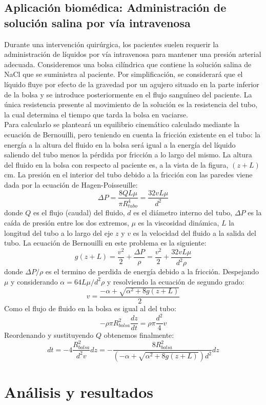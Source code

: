 \documentclass[10pt]{article}
\begin{document}
\begin{multicols}{2}
		\subsection{Aplicación biomédica: Administración de solución salina por vía intravenosa}
		Durante una intervención quirúrgica, los pacientes suelen
		requerir la administración de líquidos por vía intravenosa para
		mantener una presión arterial adecuada. Consideremos una
		bolsa cilíndrica que contiene la solución salina de
		NaCl que se suministra al paciente. Por simplificación, se
		considerará que el líquido fluye por efecto de la gravedad por
		un agujero situado en la parte inferior de la bolsa y se introduce
		posteriormente en el flujo sanguíneo del paciente. La única
		resistencia presente al movimiento de la solución es la
		resistencia del tubo, la cual determina el tiempo que tarda la
		bolsa en vaciarse. \\
		Para calcularlo se planteará un equilibrio cinemático calculado
		mediante la ecuación de Bernouilli, pero teniendo en cuenta la fricción existente en
		el tubo: la energía a la altura del fluido en la bolsa será igual a la energía del líquido
		saliendo del tubo menos la pérdida por fricción a lo largo del mismo. La altura del
		fluido en la bolsa con respecto al paciente es, a la vista de la figura, $(z+L)$ cm.
		La presión en el interior del tubo debido a la fricción con las paredes viene dada por la ecuación de Hagen-Poisseuille:
		$$\Delta P=\frac{8QL\mu}{\pi R_{tubo}^4}=\frac{32vL\mu}{d^2}$$
		donde $Q$ es el flujo (caudal) del fluido, $d$ es el diámetro interno del tubo, $\Delta P$ es la caída de presión entre los dos extremos, $\mu$ es la viscosidad dinámica, $L$ la longitud del tubo a lo largo del eje $z$ y $v$ es la velocidad del fluido a la salida del tubo.
		La ecuación de Bernouilli en este problema es la siguiente:
		$$g(z+L)=\frac{v^2}{2}+\frac{\Delta P}{\rho}=\frac{v^2}{2}+\frac{32vL\mu}{d^2\rho}$$
		donde $\Delta P/\rho$ es el termino de perdida de energía debido a la fricción.
		Despejando $\mu$ y considerando $\alpha=64L\mu/d^2\rho$ y resolviendo la ecuación de segundo grado:
		$$v=\frac{-\alpha+\sqrt{\alpha^2+8g(z+L)}}{2}$$
		Como el flujo de fluido en la bolsa es igual al del tubo:
		$$-\rho\pi R_{bolsa}^2\frac{dz}{dt}=\rho\pi\frac{d^2}{4}v$$
		Reordenando y sustituyendo $Q$ obtenemos finalmente:
		$$dt=-4\frac{R_{bolsa}^2}{d^2v}dz=-\frac{8R_{bolsa}^2}{(-\alpha+\sqrt{\alpha^2+8g(z+L)})d^2}dz$$			
		\section{Análisis y resultados}

\end{multicols}
\end{document}
